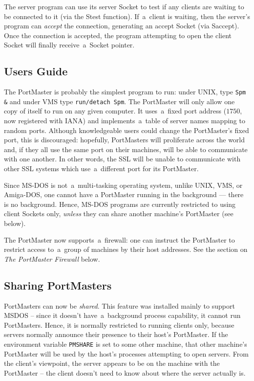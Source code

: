 \documentclass[12pt]{article}
\def\SSL{{\small SSL}}
\begin{document}
The server program can use its server Socket to test if any clients are waiting
to be connected to it (via the Stest function).  If~a~client is waiting, then
the server's program can {\em accept} the connection, generating an accept
Socket (via Saccept).  Once the connection is accepted, the program attempting
to open the client Socket will finally receive~a~Socket pointer.


\subsection{Users Guide}

The PortMaster is probably the simplest program to run:  under {\small UNIX},
type \verb`Spm &` and under {\small VMS} type \verb`run/detach Spm`.  The
PortMaster will only allow one copy of itself to run on any given computer.  It
uses~a~fixed port address ($1750$, now registered with {\small IANA}) and
implements~a~table of server names mapping to random ports.  Although
knowledgeable users could change the PortMaster's fixed port, this is
discouraged: hopefully, PortMasters will proliferate across the world and, if
they all use the same port on their machines, will be able to communicate with
one another.  In other words, the {\SSL} will be unable to communicate with
other {\SSL} systems which use~a~different port for its PortMaster.

Since {\small MS-DOS} is not~a~multi-tasking operating system, unlike
{\small UNIX}, {\small VMS}, or {\small Amiga-DOS}, one cannot have a
PortMaster running in the background --- there is no background.  Hence,
{\small MS-DOS} programs are currently restricted to using client Sockets only,
{\em unless} they can share another machine's PortMaster (see below).

The PortMaster now supports~a~firewall: one can instruct the PortMaster
to restrict access to~a~group of machines by their host addresses.  See the
section on {\em The PortMaster Firewall} below.

\subsection{Sharing PortMasters}

PortMasters can now be {\em shared}.  This feature was installed mainly to
support {\small MSDOS} -- since it doesn't have~a~background process
capability, it cannot run PortMasters.  Hence, it is normally restricted to
running clients only, because servers normally announce their presence to their
host's PortMaster.  If the environment variable \verb`PMSHARE` is set to some other
machine, that other machine's PortMaster will be used by the host's processes
attempting to open servers.  From the client's viewpoint, the server appears to
be on the machine with the PortMaster -- the client doesn't need to know about
where the server actually is.
\end{document}
